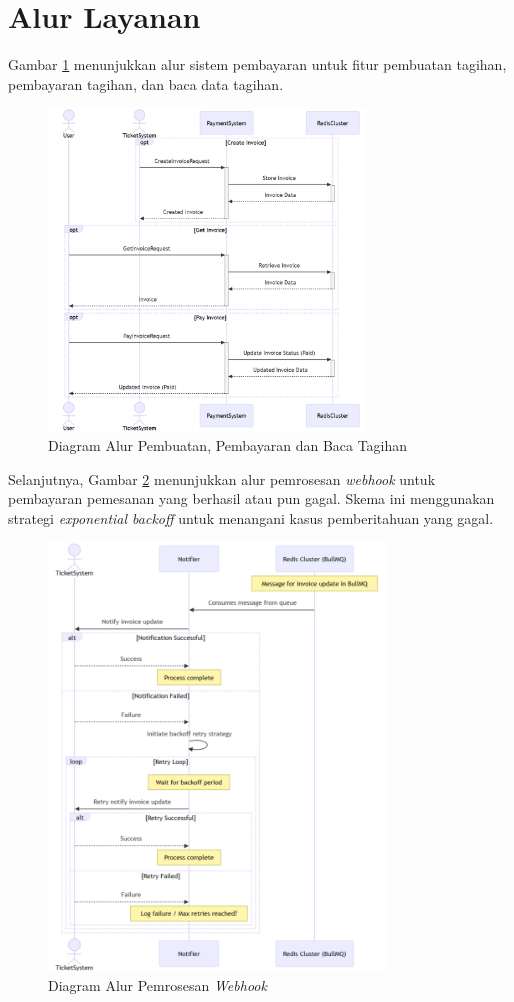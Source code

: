 \section{Alur Layanan}

Gambar \ref{fig:payment-flow1} menunjukkan alur sistem pembayaran untuk fitur pembuatan tagihan, pembayaran tagihan, dan baca data tagihan.

\begin{figure}[htbp]
    \centering
    \includegraphics[width=0.75\textwidth]{resources/chapter-3/payment-flow1.png}
    \caption{Diagram Alur Pembuatan, Pembayaran dan Baca Tagihan}
    \label{fig:payment-flow1}
\end{figure}

\pagebreak

Selanjutnya, Gambar \ref{fig:payment-flow2} menunjukkan alur pemrosesan \textit{webhook} untuk pembayaran pemesanan yang berhasil atau pun gagal. Skema ini menggunakan strategi \textit{exponential backoff} untuk menangani kasus pemberitahuan yang gagal.

\begin{figure}[htbp]
    \centering
    \includegraphics[width=0.8\textwidth]{resources/chapter-3/payment-flow2.png}
    \caption{Diagram Alur Pemrosesan \textit{Webhook}}
    \label{fig:payment-flow2}
\end{figure}